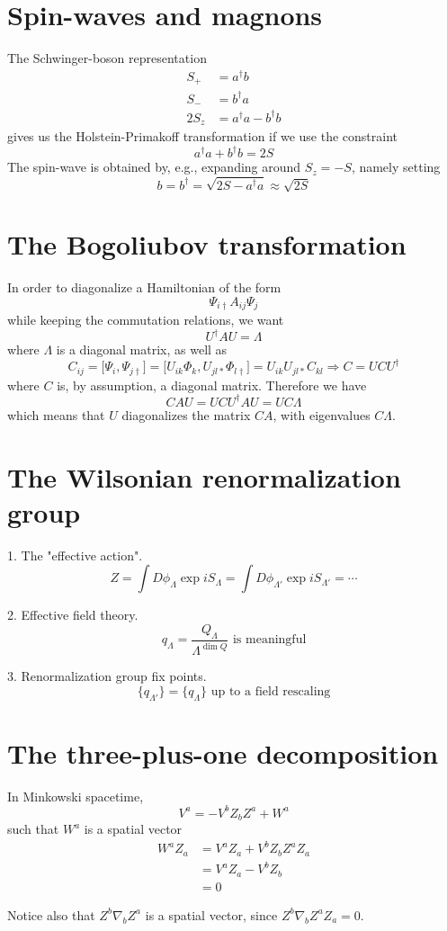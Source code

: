 \documentclass[12pt, oneside]{book}
\begin{document}
\section*{Spin-waves and magnons}
The Schwinger-boson representation
\begin{align*}
S_+&=a^{\dagger}b\\
S_-&=b^{\dagger}a\\
2S_z&=a^{\dagger}a-b^{\dagger}b
\end{align*}
gives us the Holstein-Primakoff transformation if we use the constraint
\[
a^{\dagger}a+b^{\dagger}b=2S
\]
The spin-wave is obtained by, e.g., expanding around $S_z=-S$, namely setting
\[
b=b^{\dagger}=\sqrt{2S-a^{\dagger}a}\approx\sqrt{2S}
\]

\section*{The Bogoliubov transformation}
In order to diagonalize a Hamiltonian of the form
\[
\Psi_{i\dagger}A_{ij}\Psi_j
\]
while keeping the commutation relations, we want
\[
U^{\dagger}AU=\Lambda
\]
where $\Lambda$ is a diagonal matrix, as well as
\[
C_{ij}=\big[\Psi_i,\Psi_{j\dagger}\big]=\big[U_{ik}\Phi_k,U_{jl*}\Phi_{l\dagger}\big]=U_{ik}U_{jl*}C_{kl}\Rightarrow
C=UCU^{\dagger}
\]
where $C$ is, by assumption, a diagonal matrix. Therefore we have
\[
CAU=UCU^{\dagger}AU=UC\Lambda
\]
which means that $U$ diagonalizes the matrix $CA$, with eigenvalues $C\Lambda$.

\section*{The Wilsonian renormalization group}
1. The "effective action".
\[
Z=\int D\phi_{\Lambda}\exp{iS_{\Lambda}}=\int D\phi_{\Lambda'}\exp{iS_{\Lambda'}}=\cdots
\]

2. Effective field theory.
\[
\text{$q_{\Lambda}=\frac{Q_{\Lambda}}{\Lambda^{\dim{Q}}}$ is meaningful}
\]

3. Renormalization group fix points.
\[
\text{$\big\{q_{\Lambda'}\big\}=\big\{q_{\Lambda}\big\}$ up to a field rescaling}
\]

\clearpage

\section*{The three-plus-one decomposition}
In Minkowski spacetime,
\[
V^a=-V^bZ_bZ^a+W^a
\]
such that $W^a$ is a spatial vector
\begin{align*}
W^aZ_a
&=V^aZ_a+V^bZ_bZ^aZ_a\\
&=V^aZ_a-V^bZ_b\\
&=0
\end{align*}

Notice also that $Z^b\nabla_bZ^a$ is a spatial vector, since $Z^b\nabla_bZ^aZ_a=0$.
\end{document}

